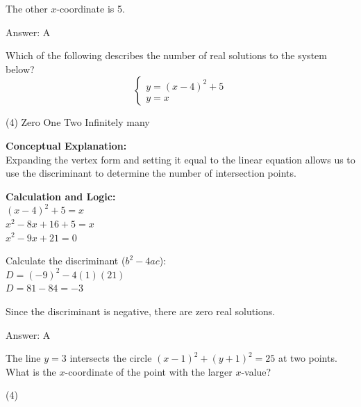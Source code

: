 \documentclass[11pt,paper=a4,answers]{exam}
\begin{document}
\begin{questions}
\begin{solution}
The other $x$-coordinate is 5.

\vspace{25pt}

Answer: \colorbox{yellow!100}{A}
\end{solution}

\vspace{40pt}

\question
Which of the following describes the number of real solutions to the system below?
\[ \begin{cases} y = (x - 4)^2 + 5 \\ y = x \end{cases} \]
\begin{tasks}(4)
    \task Zero
    \task One
    \task Two
    \task Infinitely many
\end{tasks}

\begin{solution}
\textbf{Conceptual Explanation:} \\
Expanding the vertex form and setting it equal to the linear equation allows us to use the discriminant to determine the number of intersection points.

\vspace{20pt}

\textbf{Calculation and Logic:} \\
$(x - 4)^2 + 5 = x$ \\
$x^2 - 8x + 16 + 5 = x$ \\
$x^2 - 9x + 21 = 0$

\vspace{10pt}

Calculate the discriminant ($b^2 - 4ac$): \\
$D = (-9)^2 - 4(1)(21)$ \\
$D = 81 - 84 = -3$

\vspace{10pt}

Since the discriminant is negative, there are zero real solutions.

\vspace{25pt}

Answer: \colorbox{yellow!100}{A}
\end{solution}

\vspace{40pt}

\question
The line $y = 3$ intersects the circle $(x - 1)^2 + (y + 1)^2 = 25$ at two points. What is the $x$-coordinate of the point with the larger $x$-value?
\begin{tasks}(4)
\end{tasks}


\end{questions}
\end{document}
